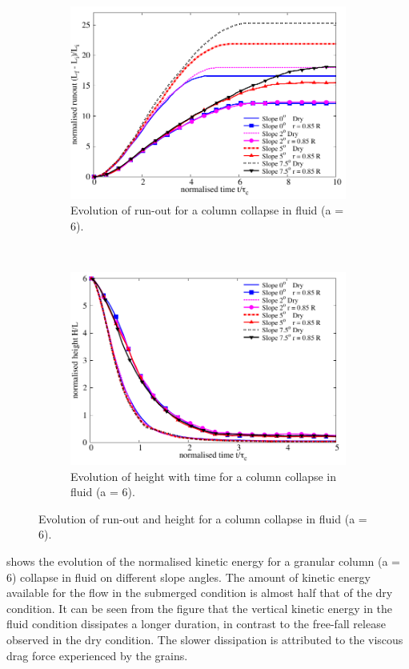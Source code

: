 \documentclass[epj,twocolumn]{webofc}
\begin{document}
\begin{figure}
\centering
\begin{subfigure}[t]{0.9\linewidth}
\includegraphics[width=0.9\linewidth]{figs/runout_a6_slope}
\caption{Evolution of run-out for a column collapse in fluid (a = 6).}
\label{fig:Runout_a6_slope}
\end{subfigure} \\
\begin{subfigure}[t]{0.9\linewidth}
\centering
\includegraphics[width=0.9\linewidth]{figs/height_a6_slope}
\caption{Evolution of height with time for a column collapse in fluid (a = 6).}
\label{fig:Height_a6_slope}
\end{subfigure}
\caption{Evolution of  run-out and height  for a column collapse in fluid (a = 
6).}
\label{fig:a6_slope}
\end{figure}

 shows the evolution of the normalised kinetic energy 
for a granular column (a = 6) collapse in fluid on different slope angles. The 
amount of kinetic energy available for the flow in the submerged condition 
is almost half that of the dry condition. It can be seen from the figure that 
the vertical kinetic energy in the fluid condition dissipates a longer 
duration, in contrast to the free-fall release observed in the dry condition. 
The slower dissipation is attributed to the viscous drag force experienced by 
the grains. 
\end{document}
